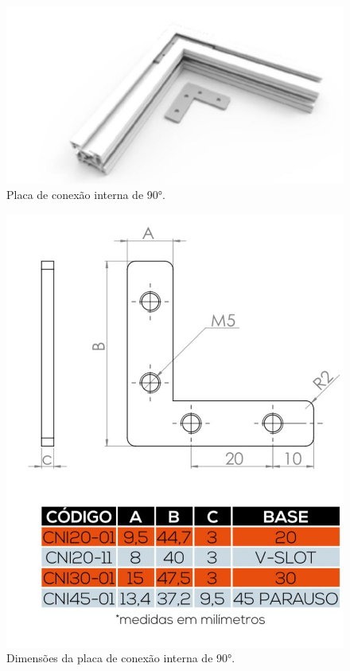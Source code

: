 \begin{figure}[H]
\centering
\caption{Placa de conexão interna de 90°.}\label{fig:pconexao90p}
\includegraphics[scale = 0.4]{figuras/pconexao90p}
\end{figure}
    
\begin{figure}[H]
\centering
\caption{Dimensões da placa de conexão interna de 90°.}\label{fig:pconexao90d}
\includegraphics[scale = 0.35]{figuras/pconexao90d}
\end{figure}

